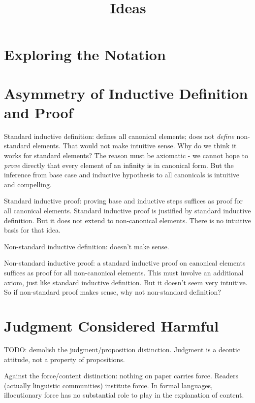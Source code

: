 \documentclass{article}
\begin{document}
\title{Ideas}
\maketitle
\large

\tableofcontents

\section{Exploring the Notation}


\section{Asymmetry of Inductive Definition and Proof}

Standard inductive definition: defines all canonical elements; does
not \emph{define} non-standard elements.  That would not make
intuitive sense.  Why do we think it works for standard elements?  The
reason must be axiomatic - we cannot hope to \emph{prove} directly
that every element of an infinity is in canonical form.  But the
inference from base case and inductive hypothesis to all canonicals is
intuitive and compelling.

Standard inductive proof: proving base and inductive steps suffices as
proof for all canonical elements.  Standard inductive proof is
justified by standard inductive definition.  But it does not extend to
non-canonical elements.  There is no intuitive basis for that idea.

Non-standard inductive definition:  doesn't make sense.

Non-standard inductive proof: a standard inductive proof on canonical
elements suffices as proof for all non-canonical elements.  This must
involve an additional axiom, just like standard inductive definition.
But it doesn't seem very intuitive.  So if non-standard proof makes
sense, why not non-standard definition?

\section{Judgment Considered Harmful}

TODO: demolish the judgment/proposition distinction.  Judgment is a
deontic attitude, not a property of propositions.

Against the force/content distinction: nothing on paper carries force.
Readers (actually linguistic communities) institute force.  In formal
languages, illocutionary force has no substantial role to play in the
explanation of content.
\end{document}
